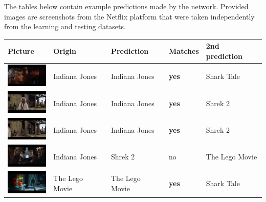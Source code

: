 \documentclass[conference]{IEEEtran}
\begin{document}
The tables below contain example predictions made by the network. Provided images are screenshots from the Netflix platform that were taken independently from the learning and testing datasets.

\vspace{5pt} 
\begin{table}[ht]
  \begin{tabular}{||P{2cm}|P{1.0cm}|P{1.2cm}|P{1.0cm}|P{1.2cm}||}

  \hline Picture & Origin & Prediction & Matches & 2nd prediction\\
  \hline\vspace{0.1cm}
  \includegraphics[width=2cm]{indiana_0.png} & Indiana Jones & Indiana Jones & \textbf{yes} & Shark Tale\\
  
  \hline\vspace{0.1cm}
  \includegraphics[width=2cm]{indiana_1.png} & Indiana Jones & Indiana Jones & \textbf{yes} & Shrek 2\\
  
  \hline\vspace{0.1cm}
  \includegraphics[width=2cm]{indiana_2.png} & Indiana Jones & Indiana Jones & \textbf{yes} & Shrek 2\\
  
  \hline\vspace{0.1cm}
  \includegraphics[width=2cm]{indiana_3.png} & Indiana Jones & Shrek 2 & no & The Lego Movie\\
  
  
  \hline\vspace{0.1cm}
  \includegraphics[width=2cm]{lego_0.png} & The Lego Movie & The Lego Movie & \textbf{yes} & Shark Tale\\
  

\end{tabular}
\end{table}
\end{document}
